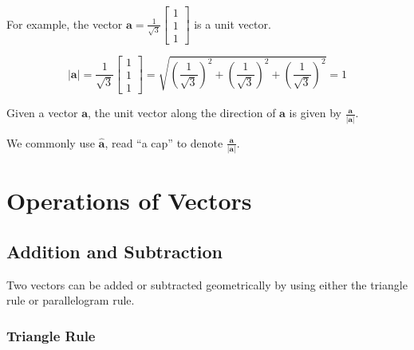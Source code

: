 \documentclass[11pt,a4paper]{book}
\begin{document}
For example, the vector ${\displaystyle{\textbf{a}}=\frac{1}{\sqrt{3}}\begin{bmatrix}1\\
1\\
1
\end{bmatrix}}$ is a unit vector.

\[
\left|\ensuremath{\textbf{a}}\right|=\frac{1}{\sqrt{3}}\begin{bmatrix}1\\
1\\
1
\end{bmatrix}=\sqrt{\left(\frac{1}{\sqrt{3}}\right)^{2}+\left(\frac{1}{\sqrt{3}}\right)^{2}+\left(\frac{1}{\sqrt{3}}\right)^{2}}=1
\]

Given a vector $\ensuremath{\textbf{a}}$, the unit vector along the
direction of $\ensuremath{\textbf{a}}$ is given by ${\displaystyle \frac{\ensuremath{\textbf{a}}}{\left|\ensuremath{\textbf{a}}\right|}}$.

We commonly use $\hat{\textbf{a}}$, read ``a cap'' to denote ${\displaystyle \frac{\ensuremath{\textbf{a}}}{\left|\ensuremath{\textbf{a}}\right|}}$.

\section{Operations of Vectors}

\subsection{Addition and Subtraction}

Two vectors can be added or subtracted geometrically by using either
the triangle rule or parallelogram rule.

\subsubsection{Triangle Rule}
\end{document}
